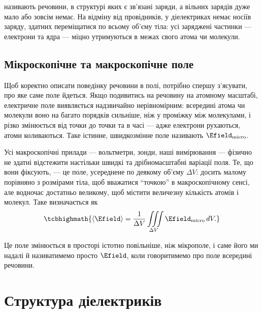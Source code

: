 \begin{Attention}
	 називають речовини, в структурі яких є зв'язані заряди, а вільних зарядів дуже мало або зовсім немає. На відміну від
	провідників, у діелектриках немає носіїв заряду, здатних переміщатися по всьому об'єму тіла: усі заряджені частинки --- електрони та ядра ---
	міцно утримуються в межах свого атома чи молекули.
\end{Attention}

\subsection*{Мікроскопічне та макроскопічне поле}

Щоб коректно описати поведінку речовини в полі, потрібно спершу з'ясувати, про яке саме поле йдеться. Якщо подивитись на речовину на атомному
масштабі, електричне поле виявляється надзвичайно нерівномірним: всередині атома чи молекули воно на багато порядків сильніше, ніж у проміжку між
молекулами, і різко змінюється від точки до точки та в часі --- адже електрони рухаються, атоми коливаються. Таке істинне, швидкозмінне поле
називають  $\Efield_\text{micro}$.

Усі макроскопічні прилади --- вольтметри, зонди, наші вимірювання --- фізично не здатні відстежити настільки швидкі та дрібномасштабні варіації поля.
Те, що вони фіксують, --- це поле, усереднене по деякому  об'єму $\Delta V$: досить малому порівняно з розмірами
тіла, щоб вважатися \enquote{точкою} в макроскопічному сенсі, але водночас достатньо великому, щоб містити величезну кількість атомів і молекул. Таке
 визначається як
\begin{equation}\label{eq:AvgField}
	\tcbhighmath{
		\left\langle \Efield\right\rangle = \frac1{\Delta V} \iiint\limits_{\Delta V} \Efield_\text{micro}\, dV.
	}
\end{equation}

Це поле змінюється в просторі істотно повільніше, ніж мікрополе, і саме його ми надалі й називатимемо просто $\Efield$, коли говоритимемо про поле
всередині речовини.

\section{Структура діелектриків}


